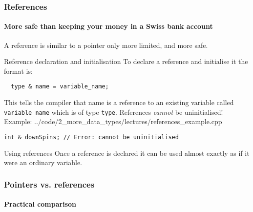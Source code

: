 \documentclass{beamer}
\begin{document}
\begin{frame}[fragile]
  \frametitle{References}
  \framesubtitle{More safe than keeping your money in a Swiss bank account}
  
  A reference is similar to a pointer only more limited, and more safe.
  \begin{block}{Reference declaration and initialisation}
	  To declare a reference and initialise it the format is:
		  \begin{lstlisting}
  type & name = variable_name;
		  \end{lstlisting}
	  This tells the compiler that name is a reference to an existing variable called \texttt{variable\_name} which is of type \texttt{type}.  References \textit{cannot} be uninitialised!\newline
		Example:
      {../code/2_more_data_types/lectures/references_example.cpp}
    \begin{lstlisting}[aboveskip=0pt,belowskip=0pt]
  int & downSpins; // Error: cannot be uninitialised
    \end{lstlisting}  
  \end{block}
  \pause
  \begin{block}{Using references}
  	Once a reference is declared it can be used almost exactly as if it were an ordinary variable.
  \end{block}

\end{frame}

\begin{frame}
  \frametitle{Pointers vs. references}
  \framesubtitle{Practical comparison}
  
  	\begin{columns}[t]
  	  \begin{column}[T]{0.5\textwidth}

			\end{column}
  	  \begin{column}[T]{0.5\textwidth}
  	    
  	  \end{column}
  	\end{columns}
  
\end{frame}
\end{document}
